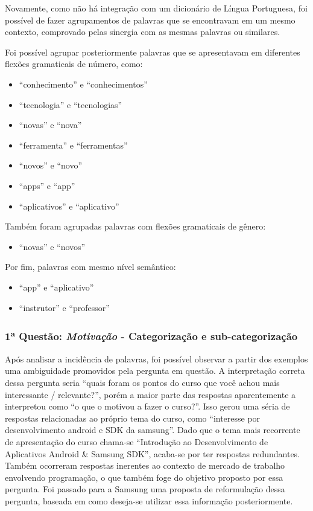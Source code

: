Novamente, como não há integração com um dicionário de Língua Portuguesa, foi possível de fazer agrupamentos de palavras que se encontravam em um mesmo contexto, comprovado pelas sinergia com as mesmas palavras ou similares. 

Foi possível agrupar posteriormente palavras que se apresentavam em diferentes flexões gramaticais de número, como: 

\begin{itemize}
\item \enquote{conhecimento} e \enquote{conhecimentos}
\item \enquote{tecnologia} e \enquote{tecnologias} 
\item \enquote{novas} e \enquote{nova} 
\item \enquote{ferramenta} e \enquote{ferramentas} 
\item \enquote{novos} e \enquote{novo} 
\item \enquote{apps} e \enquote{app}
\item \enquote{aplicativos} e \enquote{aplicativo}
\end{itemize}

Também foram agrupadas palavras com flexões gramaticais de gênero:

\begin{itemize}
\item \enquote{novas} e \enquote{novos}
\end{itemize}

Por fim, palavras com mesmo nível semântico:

\begin{itemize}
\item \enquote{app} e \enquote{aplicativo}
\item \enquote{instrutor} e \enquote{professor}
\end{itemize}



\subsubsection*{1\textsuperscript{a} Questão: \textit{Motivação} - Categorização e sub-categorização }

Após analisar a incidência de palavras, foi possível observar a partir dos exemplos uma ambiguidade promovidos pela pergunta em questão. A interpretação correta dessa pergunta seria \enquote{quais foram os pontos do curso que você achou mais interessante / relevante?}, porém a maior parte das respostas aparentemente a interpretou como \enquote{o que o motivou a fazer o curso?}. Isso gerou uma séria de respostas relacionadas ao próprio tema do curso, como \enquote{interesse por desenvolvimento android e SDK da samsung}. Dado que o tema mais recorrente de apresentação do curso chama-se \enquote{Introdução ao Desenvolvimento de Aplicativos Android \& Samsung SDK}, acaba-se por ter respostas redundantes. Também ocorreram respostas inerentes ao contexto de mercado de trabalho envolvendo programação, o que também foge do objetivo proposto por essa pergunta. Foi passado para a Samsung uma proposta de reformulação dessa pergunta, baseada em como deseja-se utilizar essa informação posteriormente.


